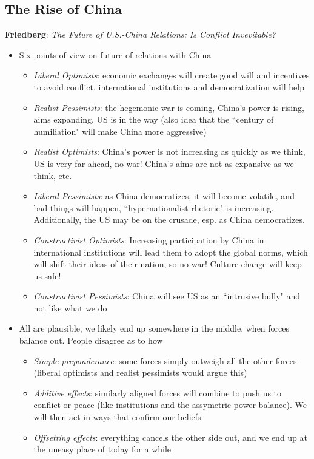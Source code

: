 \documentclass{article}
\begin{document}
\subsection*{The Rise of China}
\textbf{Friedberg}: \textit{The Future of U.S.-China Relations: Is Conflict Invevitable?}
\begin{itemize}
    \item Six points of view on future of relations with China
    \begin{itemize}
        \item \textit{Liberal Optimists}: economic exchanges will create good will and incentives to avoid conflict, international institutions and democratization will help
        \item \textit{Realist Pessimists}: the hegemonic war is coming, China's power is rising, aims expanding, US is in the way (also idea that the ``century of humiliation" will make China more aggressive)
        \item \textit{Realist Optimists}: China's power is not increasing as quickly as we think, US is very far ahead, no war! China's aims are not as expansive as we think, etc.
        \item \textit{Liberal Pessimists}: as China democratizes, it will become volatile, and bad things will happen, ``hypernationalist rhetoric" is increasing. Additionally, the US may be on the crusade, esp. as China democratizes. 
        \item \textit{Constructivist Optimists}: Increasing participation by China in international institutions will lead them to adopt the global norms, which will shift their ideas of their nation, so no war! Culture change will keep us safe!
        \item \textit{Constructivist Pessimists}: China will see US as an ``intrusive bully" and not like what we do
    \end{itemize}
    \item All are plausible, we likely end up somewhere in the middle, when forces balance out. People disagree as to how
    \begin{itemize}
        \item \textit{Simple preponderance}: some forces simply outweigh all the other forces (liberal optimists and realist pessimists would argue this)
        \item \textit{Additive effects}: similarly aligned forces will combine to push us to conflict or peace (like institutions and the assymetric power balance). We will then act in ways that confirm our beliefs.
        \item \textit{Offsetting effects}: everything cancels the other side out, and we end up at the uneasy place of today for a while
    \end{itemize}
\end{itemize}
\end{document}
